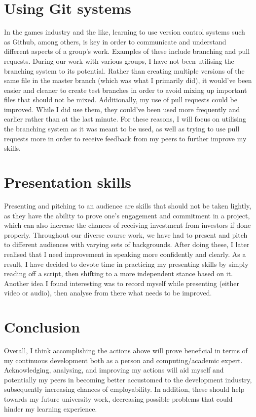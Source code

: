 \documentclass{scrartcl}
\begin{document}
\section{Using Git systems}
In the games industry and the like, learning to use version control systems such as Github, among others, is key in order to communicate and understand different aspects of a group's work. Examples of these include branching and pull requests. During our work with various groups, I have not been utilising the branching system to its potential. Rather than creating multiple versions of the same file in the master branch (which was what I primarily did), it would've been easier and cleaner to create test branches in order to avoid mixing up important files that should not be mixed. Additionally, my use of pull requests could be improved. While I did use them, they could've been used more frequently and earlier rather than at the last minute. For these reasons, I will focus on utilising the branching system as it was meant to be used, as well as trying to use pull requests more in order to receive feedback from my peers to further improve my skills. 

\section{Presentation skills}
Presenting and pitching to an audience are skills that should not be taken lightly, as they have the ability to prove one's engagement and commitment in a project, which can also increase the chances of receiving investment from investors if done properly. Throughout our diverse course work, we have had to present and pitch to different audiences with varying sets of backgrounds. After doing these, I later realised that I need improvement in speaking more confidently and clearly. As a result, I have decided to devote time in practicing my presenting skills by simply reading off a script, then shifting to a more independent stance based on it. Another idea I found interesting was to record myself while presenting (either video or audio), then analyse from there what needs to be improved. 

\section{Conclusion}
Overall, I think accomplishing the actions above will prove beneficial in terms of my continuous development both as a person and computing/academic expert. Acknowledging, analysing, and improving my actions will aid myself and potentially my peers in becoming better accustomed to the development industry, subsequently increasing chances of employability. In addition, these should help towards my future university work, decreasing possible problems that could hinder my learning experience.   
\end{document}
